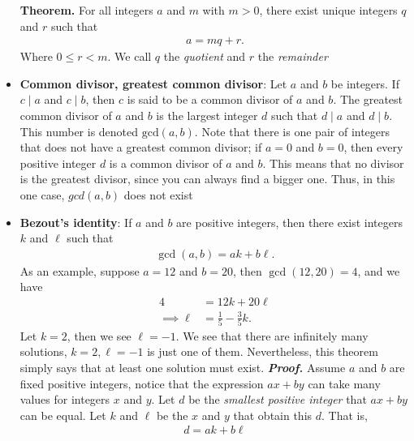 \documentclass{report}
\begin{document}
\begin{itemize}
            \bigbreak \noindent 
            \textbf{Theorem.} For all integers $a$ and $m $ with $m>0 $, there exist unique integers $q $ and $r $ such that
            \begin{align*}
                a = mq + r
            .\end{align*}
            Where $0 \leq r < m$. We call $q$ the \textit{quotient} and $r$ the \textit{remainder}
        \item \textbf{Common divisor, greatest common divisor}:
            Let $a$ and $b$ be integers. If $c \mid a$ and $c \mid b$, then $c$ is said to be a common divisor of $a$ and $b$.
            \bigbreak \noindent 
            The greatest common divisor of $a$ and $b$ is the largest integer $d$ such that $d \mid a$ and $d \mid b$. This number is denoted $\text{gcd}(a, b)$.
            \bigbreak \noindent 
            Note that there is one pair of integers that does not have a greatest common divisor; if $a = 0$ and $b = 0$, then every positive integer $d$ is a common divisor of $a$ and $b$. This means that no divisor is the greatest divisor, since you can always find a bigger one. Thus, in this one case, $gcd(a, b)$ does not exist
        \item \textbf{Bezout's identity}: If $a$ and $b$ are positive integers, then there exist integers $k$ and $\ell$ such that
            \begin{align*}
                \gcd{(a, b)} = ak + b\ell
            .\end{align*}
            \bigbreak \noindent 
            As an example, suppose $a=12$ and $b=20$, then $\gcd{(12,20)} =4$, and we have
            \begin{align*}
                4 &= 12k + 20 \ell  \\
                \implies \ell &= \frac{1}{5}-\frac{3}{5}k
            .\end{align*}
            Let $k=2$, then we see $\ell = -1$. We see that there are infinitely many solutions, $k=2, \ell = -1$ is just one of them. Nevertheless, this theorem simply says that at least one solution must exist. 
            \bigbreak \noindent 
            \textbf{\textit{Proof.}} Assume $a$ and $b$ are fixed positive integers, notice that the expression $ax + by$ can take many values for integers $x$ and $y$. Let $d$ be the \textit{smallest positive integer} that $ax + by$ can be equal. Let $k$ and $\ell$ be the $x$ and $y$ that obtain this $d$. That is, 
            \begin{align*}
                d = ak + b\ell

\end{align*}
\end{itemize}
\end{document}
